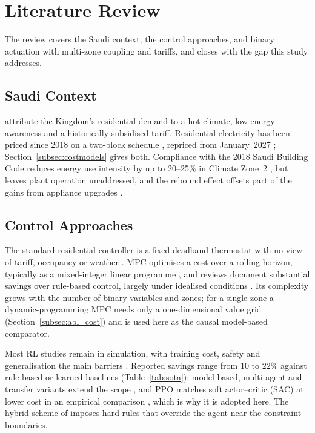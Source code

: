 \documentclass[pdflatex,sn-mathphys-num,iicol]{sn-jnl}
\theoremstyle{thmstyleone}\newtheorem{proposition}{Proposition}\newtheorem{corollary}{Corollary}
\theoremstyle{thmstyletwo}\newtheorem{remark}{Remark}\newtheorem{observation}{Observation}
\theoremstyle{thmstylethree}\newtheorem{definition}{Definition}
\begin{document}
\section{Literature Review}
\label{sec:litreview}

The review covers the Saudi context, the control approaches, and binary actuation with multi-zone coupling and tariffs, and closes with the gap this study addresses.

\subsection{Saudi Context}

\citet{AlHomoud2021} attribute the Kingdom's residential demand to a hot climate, low energy awareness and a historically subsidised tariff. Residential electricity has been priced since 2018 on a two-block schedule \citep{SEC2024}, repriced from January~2027 \citep{SaudiEnergy2027}; Section~\ref{subsec:costmodels} gives both. Compliance with the 2018 Saudi Building Code \citep{Alayed2021} reduces energy use intensity by up to 20--25\% in Climate Zone~2 \citep{Olawale2025}, but leaves plant operation unaddressed, and the rebound effect offsets part of the gains from appliance upgrades \citep{Belaid2024}.

\subsection{Control Approaches}

The standard residential controller is a fixed-deadband thermostat with no view of tariff, occupancy or weather \citep{Alotaibi2024}. MPC optimises a cost over a rolling horizon, typically as a mixed-integer linear programme \citep{Risbeck2017,Dinh2022}, and reviews document substantial savings over rule-based control, largely under idealised conditions \citep{Drgona2020}. Its complexity grows with the number of binary variables and zones; for a single zone a dynamic-programming MPC needs only a one-dimensional value grid (Section~\ref{subsec:abl_cost}) and is used here as the causal model-based comparator.

Most RL studies remain in simulation, with training cost, safety and generalisation the main barriers \citep{WangHong2020}. Reported savings range from $10$ to $22\%$ against rule-based or learned baselines \citep{Azuatalam2020,Biemann2021,Du2021b,Du2021a} (Table~\ref{tab:sota}); model-based, multi-agent and transfer variants extend the scope \citep{Ding2024,Liu2024,Hou2024}, and PPO matches soft actor--critic (SAC) at lower cost in an empirical comparison \citep{Manjavacas2024}, which is why it is adopted here. The hybrid scheme of \citep{Xu2025} imposes hard rules that override the agent near the constraint boundaries.
\end{document}

